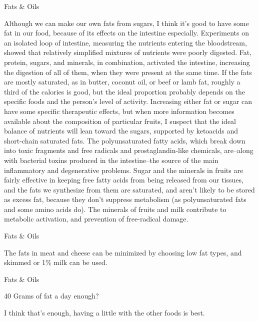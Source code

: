 \documentclass[11pt,oneside,openany,extrafontsizes]{memoir}
\begin{document}
\begin{standalonequote}{Fats \& Oils}

    \begin{answer}
        Although we can make our own fats from sugars, I think it's good to have some fat in our food, because of its effects on the intestine especially. Experiments on an isolated loop of intestine, measuring the nutrients entering the bloodstream, showed that relatively simplified mixtures of nutrients were poorly digested. Fat, protein, sugars, and minerals, in combination, activated the intestine, increasing the digestion of all of them, when they were present at the same time. If the fats are mostly saturated, as in butter, coconut oil, or beef or lamb fat, roughly a third of the calories is good, but the ideal proportion probably depends on the specific foods and the person's level of activity. Increasing either fat or sugar can have some specific therapeutic effects, but when more information becomes available about the composition of particular fruits, I suspect that the ideal balance of nutrients will lean toward the sugars, supported by ketoacids and short-chain saturated fats. The polyunsaturated fatty acids, which break down into toxic fragments and free radicals and prostaglandin-like chemicals, are--along with bacterial toxins produced in the intestine--the source of the main inflammatory and degenerative problems. Sugar and the minerals in fruits are fairly effective in keeping free fatty acids from being released from our tissues, and the fats we synthesize from them are saturated, and aren't likely to be stored as excess fat, because they don't suppress metabolism (as polyunsaturated fats and some amino acids do). The minerals of fruits and milk contribute to metabolic activation, and prevention of free-radical damage.
    \end{answer}
\end{standalonequote}

\begin{standalonequote}{Fats \& Oils}

    \begin{answer}
        The fats in meat and cheese can be minimized by choosing low fat types, and skimmed or 1\% milk can be used.
    \end{answer}
\end{standalonequote}

\begin{qaexchange}{Fats \& Oils}

    \begin{question}
        40 Grams of fat a day enough?
    \end{question}

    \begin{answer}
        I think that's enough, having a little with the other foods is best.
    \end{answer}
\end{qaexchange}
\end{document}
